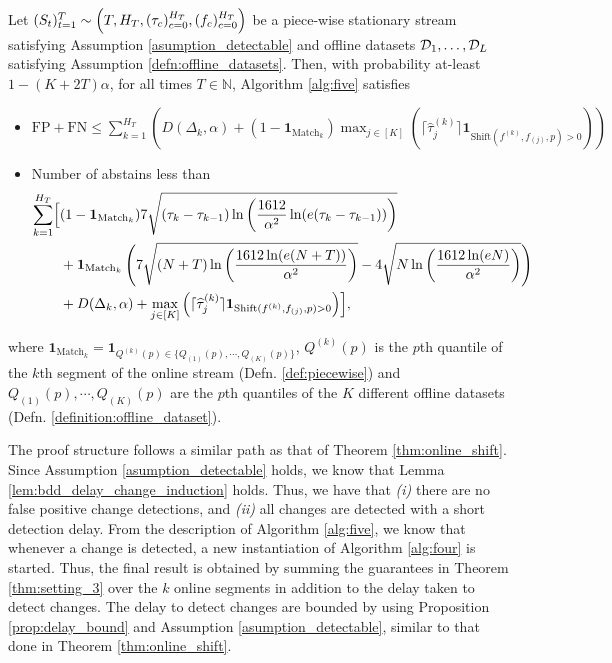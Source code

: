\begin{theorem*}[\ref{thm:core_theorem}] Let  $(S_t)_{t = 1}^T \sim \Bigl(T,H_T, (\tau_c)_{c=0}^{H_T}, (f_c)_{c=0}^{H_T}\Bigr)$  be a piece-wise stationary stream  satisfying Assumption \ref{asumption_detectable} and offline datasets  ${\mathcal{D}}_1, \ldots, {\mathcal{D}}_L$ satisfying  Assumption \ref{defn:offline_datasets}. Then, with probability at-least $1-(K+2T)\alpha$, for all times $T \in \mathbb{N}$, Algorithm \ref{alg:five} satisfies %
\begin{itemize}
    \item  $\text{FP} + \text{FN}  \leq \sum_{k=1}^{H_T} \left(D(\Delta_{k},\alpha) +  (1-\mathbf{1}_{\text{Match}_k})\max_{ j \in [K]} \left(\lceil \widehat{\tau}_j^{(k)}\rceil \mathbf{1}_{\text{Shift}(f^{(k)},f_{(j)},p) > 0}\right) \right)$ 
    \item Number of abstains less than 
    \begin{align*}
        \sum_{k=1}^{H_T} \Bigl[ &(1-\mathbf{1}_{\text{Match}_k}) 7 \sqrt{(\tau_k-\tau_{k-1}) \ln \left( \frac{1612}{\alpha^2} \ln(e(\tau_k-\tau_{k-1})) \right)}  \\ &+ \mathbf{1}_{\text{Match}_k}\left( 7 \sqrt{(N+T) \ln \left( \frac{1612\ln(e(N+T))}{\alpha^2} \right)}- 4 \sqrt{N \ln \left( \frac{1612\ln(eN)}{\alpha^2} \right)} \right) \\ &+  D(\Delta_{k},\alpha) +  \max_{ j \in [K]} \left(\lceil \widehat{\tau}_j^{(k)}\rceil \mathbf{1}_{\text{Shift}(f^{(k)},f_{(j)},p) > 0}\right)\Bigr],
    \end{align*}
\end{itemize}
where $\mathbf{1}_{\text{Match}_k} = \mathbf{1}_{Q^{(k)}(p) \in \{Q_{(1)}(p), \cdots, Q_{(K)}(p)\}}$, $Q^{(k)}(p)$ is the $p$th quantile of the $k$th segment of the online stream (Defn. \ref{def:piecewise}) and $Q_{(1)}(p), \cdots, Q_{(K)}(p)$ are the $p$th quantiles of the $K$ different offline datasets (Defn. \ref{definition:offline_dataset}).
\end{theorem*}




The proof structure follows a similar path as that of Theorem \ref{thm:online_shift}. Since Assumption \ref{asumption_detectable} holds, we know that Lemma \ref{lem:bdd_delay_change_induction} holds. Thus, we have that {\em(i)} there are no false positive change detections, and {\em(ii)} all changes are detected with a short detection delay. From the description of Algorithm \ref{alg:five}, we know that whenever a change is detected, a new instantiation of Algorithm \ref{alg:four} is started. Thus, the final result is obtained by summing the guarantees in Theorem \ref{thm:setting_3} over the $k$ online segments in addition to the delay taken to detect changes. 
The delay to detect changes are bounded by using Proposition \ref{prop:delay_bound} and Assumption \ref{asumption_detectable}, similar to that done in Theorem \ref{thm:online_shift}. 


